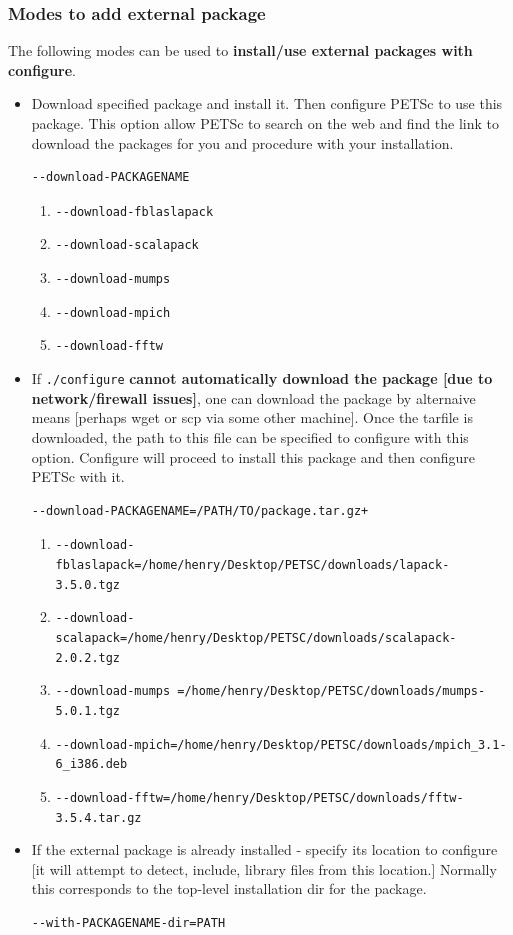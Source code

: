 \documentclass{article}
\begin{document}
\subsubsection{Modes to add external package} 
The following modes can be used to \textbf{install/use external packages with configure}.
\begin{itemize}
\item Download specified package and install it. Then configure PETSc to use this package. This option allow PETSc
to search on the web and find the link to download the packages for you and procedure with your installation.
\scriptsize
\begin{verbatim}
--download-PACKAGENAME
\end{verbatim}
\begin{enumerate}
  \item \verb+--download-fblaslapack+
  \item \verb+--download-scalapack+
  \item \verb+--download-mumps+ 
  \item \verb+--download-mpich+
  \item \verb+--download-fftw+
\end{enumerate}
\normalsize
 
\item If \verb+./configure+ \textbf{cannot automatically download the package
[due to network/firewall issues]}, one can download the package by alternaive means [perhaps wget or scp via some other machine].
Once the tarfile is downloaded, the path to this file can be specified to configure with this option. Configure will proceed to install
this package and then configure PETSc with it.
\scriptsize
\begin{verbatim}
--download-PACKAGENAME=/PATH/TO/package.tar.gz+
\end{verbatim}
\begin{enumerate}
  \item \verb+--download-fblaslapack=/home/henry/Desktop/PETSC/downloads/lapack-3.5.0.tgz+
  \item \verb+--download-scalapack=/home/henry/Desktop/PETSC/downloads/scalapack-2.0.2.tgz+
  \item \verb+--download-mumps =/home/henry/Desktop/PETSC/downloads/mumps-5.0.1.tgz+
  \item \verb+--download-mpich=/home/henry/Desktop/PETSC/downloads/mpich_3.1-6_i386.deb+
  \item \verb+--download-fftw=/home/henry/Desktop/PETSC/downloads/fftw-3.5.4.tar.gz+
\end{enumerate}
\normalsize
\item If the external package is already installed - specify its location to configure 
[it will attempt to detect, include, library files from this location.] Normally this corresponds to the top-level installation dir for the package.
\scriptsize
\begin{verbatim}
--with-PACKAGENAME-dir=PATH
\end{verbatim}


\end{itemize}
\end{document}
